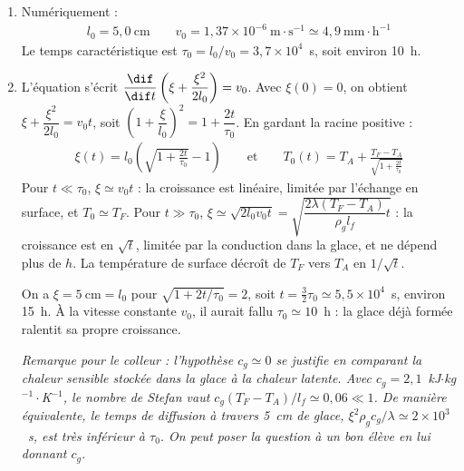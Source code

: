 \begin{correction}
\begin{enumerate}
	\textit{Remarque pour le colleur : on peut faire le raisonnement en résistances thermiques. Par unité de surface, l'échange avec l'air a une résistance $1/h$ et la glace une résistance $\xi/\lambda$, en série : la densité de flux vaut $(T_F-T_A)/(1/h+\xi/\lambda)$. La longueur $l_0$ est l'épaisseur de glace qui a la même résistance que l'échange de surface.}

	\item Numériquement :
	\begin{align*}
		l_0=5{,}0~\text{cm} \qquad v_0=1{,}37\times10^{-6}~\text{m}\cdot\text{s}^{-1}\simeq4{,}9~\text{mm}\cdot\text{h}^{-1}
	\end{align*}
	Le temps caractéristique est $\tau_0=l_0/v_0=3{,}7\times10^{4}$~s, soit environ 10~h.

	\item L'équation s'écrit $\dfrac{\dif}{\dif t}\left(\xi+\dfrac{\xi^2}{2l_0}\right)=v_0$. Avec $\xi(0)=0$, on obtient $\xi+\dfrac{\xi^2}{2l_0}=v_0t$, soit $\left(1+\dfrac{\xi}{l_0}\right)^2=1+\dfrac{2t}{\tau_0}$. En gardant la racine positive :
	\begin{align*}
		\boxed{\xi(t) = l_0\left( \sqrt{1+\frac{2t}{\tau_0}}-1\right)} \qquad\text{et}\qquad \boxed{T_0(t)=T_A+\frac{T_F-T_A}{\sqrt{1+\frac{2t}{\tau_0}}}}
	\end{align*}
	Pour $t\ll\tau_0$, $\xi\simeq v_0t$ : la croissance est linéaire, limitée par l'échange en surface, et $T_0\simeq T_F$. Pour $t\gg\tau_0$, $\xi\simeq\sqrt{2l_0v_0t}=\sqrt{\dfrac{2\lambda(T_F-T_A)}{\rho_gl_f}t}$ : la croissance est en $\sqrt{t}$, limitée par la conduction dans la glace, et ne dépend plus de $h$. La température de surface décroît de $T_F$ vers $T_A$ en $1/\sqrt{t}$.

	On a $\xi=5~\text{cm}=l_0$ pour $\sqrt{1+2t/\tau_0}=2$, soit $t=\frac{3}{2}\tau_0\simeq5{,}5\times10^{4}$~s, environ 15~h. À la vitesse constante $v_0$, il aurait fallu $\tau_0\simeq10$~h : la glace déjà formée ralentit sa propre croissance.

	\textit{Remarque pour le colleur : l'hypothèse $c_g\simeq0$ se justifie en comparant la chaleur sensible stockée dans la glace à la chaleur latente. Avec $c_g=2{,}1$~kJ$\cdot$kg$^{-1}\cdot$K$^{-1}$, le nombre de Stefan vaut $c_g(T_F-T_A)/l_f\simeq0{,}06\ll1$. De manière équivalente, le temps de diffusion à travers 5~cm de glace, $\xi^2\rho_gc_g/\lambda\simeq2\times10^{3}$~s, est très inférieur à $\tau_0$. On peut poser la question à un bon élève en lui donnant $c_g$.}

\end{enumerate}

\end{correction}

